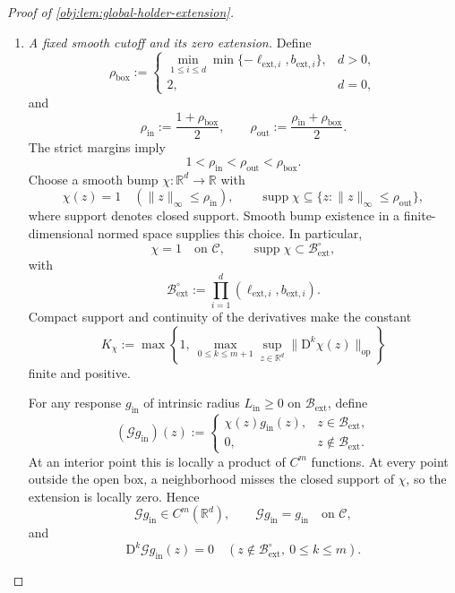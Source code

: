 \documentclass[11pt]{article}
\begin{document}
\begin{proof}[Proof of \cref{obj:lem:global-holder-extension}]
\begin{enumerate}
\item\label{proof:global-holder-extension:cutoff} \emph{A fixed smooth cutoff and its zero extension.}
Define
\[
\rho_{\mathrm{box}}:=
\begin{cases}
\displaystyle\min_{1\le i\le d}
\min\{-\ell_{\mathrm{ext},i},b_{\mathrm{ext},i}\},&d>0,\\
2,&d=0,
\end{cases}
\]
and
\[
\rho_{\mathrm{in}}:=\frac{1+\rho_{\mathrm{box}}}{2},
\qquad
\rho_{\mathrm{out}}:=\frac{\rho_{\mathrm{in}}+\rho_{\mathrm{box}}}{2}.
\]
The strict margins imply
\[
1<\rho_{\mathrm{in}}<\rho_{\mathrm{out}}<\rho_{\mathrm{box}}.
\]
Choose a smooth bump \(\chi:\mathbb R^d\to\mathbb R\) with
\[
\chi(z)=1\quad(\|z\|_\infty\le\rho_{\mathrm{in}}),
\qquad
\operatorname{supp}\chi
\subseteq\{z:\|z\|_\infty\le\rho_{\mathrm{out}}\},
\]
where support denotes closed support. Smooth bump existence in a finite-dimensional normed space supplies this choice. In particular,
\[
\chi=1\quad\text{on }\mathcal C,
\qquad
\operatorname{supp}\chi\subset
\mathcal B_{\mathrm{ext}}^\circ,
\]
with
\[
\mathcal B_{\mathrm{ext}}^\circ
:=\prod_{i=1}^d
(\ell_{\mathrm{ext},i},b_{\mathrm{ext},i}).
\]
Compact support and continuity of the derivatives make the constant
\[
K_\chi:=
\max\left\{
1,\ 
\max_{0\le k\le m+1}
\sup_{z\in\mathbb R^d}
\|\mathrm D^k\chi(z)\|_{\mathrm{op}}
\right\}
\]
finite and positive.

For any response \(g_{\mathrm{in}}\) of intrinsic radius \(L_{\mathrm{in}}\ge0\) on \(\mathcal B_{\mathrm{ext}}\), define
\[
(\mathscr G g_{\mathrm{in}})(z)
:=
\begin{cases}
\chi(z)g_{\mathrm{in}}(z),&z\in\mathcal B_{\mathrm{ext}},\\
0,&z\notin\mathcal B_{\mathrm{ext}}.
\end{cases}
\]
At an interior point this is locally a product of \(C^m\) functions. At every point outside the open box, a neighborhood misses the closed support of \(\chi\), so the extension is locally zero. Hence
\[
\mathscr G g_{\mathrm{in}}\in C^m(\mathbb R^d),
\qquad
\mathscr G g_{\mathrm{in}}=g_{\mathrm{in}}\quad\text{on }\mathcal C,
\]
and
\[
\mathrm D^k\mathscr G g_{\mathrm{in}}(z)=0
\quad(z\notin\mathcal B_{\mathrm{ext}}^\circ,\ 0\le k\le m).
\]


\end{enumerate}
\end{proof}
\end{document}
